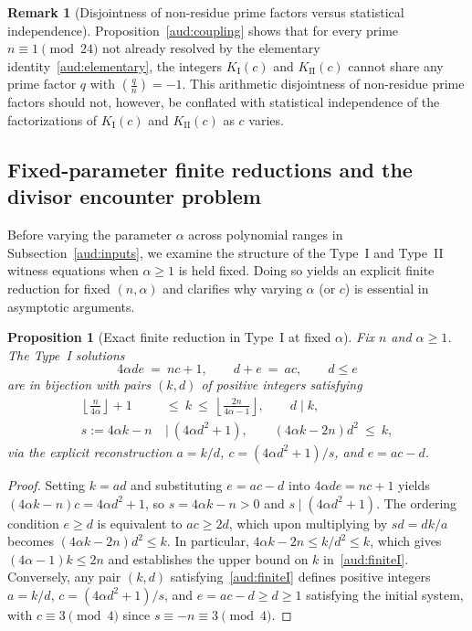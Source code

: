 \documentclass[11pt, a4paper]{article}
\theoremstyle{plain}
\newtheorem{proposition}[theorem]{Proposition}
\theoremstyle{definition}
\newtheorem{remark}[theorem]{Remark}
\newcommand{\leg}[2]{\left(\frac{#1}{#2}\right)}
\newcommand{\I}{\mathrm{I}}
\newcommand{\II}{\mathrm{II}}
\begin{document}
\begin{remark}[Disjointness of non-residue prime factors versus statistical independence]
Proposition~\ref{aud:coupling} shows that for every prime $n\equiv 1\pmod{24}$ not already resolved by the elementary identity~\eqref{aud:elementary}, the integers $K_{\I}(c)$ and $K_{\II}(c)$ cannot share any prime factor $q$ with $\leg{q}{n}=-1$. This arithmetic disjointness of non-residue prime factors should not, however, be conflated with statistical independence of the factorizations of $K_{\I}(c)$ and $K_{\II}(c)$ as $c$ varies.
\end{remark}

\subsection{Fixed-parameter finite reductions and the divisor encounter problem}\label{aud:alpha}

Before varying the parameter $\alpha$ across polynomial ranges in Subsection~\ref{aud:inputs}, we examine the structure of the Type~I and Type~II witness equations when $\alpha\ge 1$ is held fixed. Doing so yields an explicit finite reduction for fixed $(n,\alpha)$ and clarifies why varying $\alpha$ (or $c$) is essential in asymptotic arguments.

\begin{proposition}[Exact finite reduction in Type~I at fixed $\alpha$]\label{aud:fixedalphaI}
Fix $n$ and $\alpha\ge1$. The Type~I solutions
\[
4\alpha de\ =\ nc+1,\qquad d+e\ =\ ac,\qquad d\le e
\]
are in bijection with pairs $(k,d)$ of positive integers satisfying
\begin{align}
\left\lfloor\frac{n}{4\alpha}\right\rfloor+1\ &\le\ k\ \le\ \left\lfloor\frac{2n}{4\alpha-1}\right\rfloor,\qquad d\mid k,\label{aud:finiteI}\\
s:=4\alpha k-n\ &\mid\ (4\alpha d^{2}+1),\qquad (4\alpha k-2n)d^{2}\ \le\ k,\nonumber
\end{align}
via the explicit reconstruction $a=k/d$, $c=(4\alpha d^{2}+1)/s$, and $e=ac-d$.
\end{proposition}
\begin{proof}
Setting $k=ad$ and substituting $e=ac-d$ into $4\alpha de=nc+1$ yields $(4\alpha k-n)c=4\alpha d^{2}+1$, so $s=4\alpha k-n>0$ and $s\mid(4\alpha d^{2}+1)$. The ordering condition $e\ge d$ is equivalent to $ac\ge 2d$, which upon multiplying by $sd=dk/a$ becomes $(4\alpha k-2n)d^{2}\le k$. In particular, $4\alpha k-2n\le k/d^{2}\le k$, which gives $(4\alpha-1)k\le 2n$ and establishes the upper bound on $k$ in~\eqref{aud:finiteI}. Conversely, any pair $(k,d)$ satisfying~\eqref{aud:finiteI} defines positive integers $a=k/d$, $c=(4\alpha d^{2}+1)/s$, and $e=ac-d\ge d\ge 1$ satisfying the initial system, with $c\equiv3\pmod 4$ since $s\equiv -n\equiv 3\pmod 4$.
\end{proof}
\end{document}
